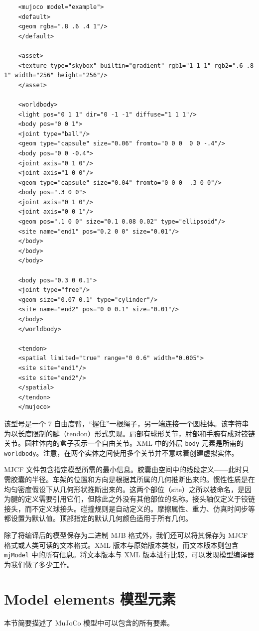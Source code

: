 \begin{lstlisting}
	<mujoco model="example">
	<default>
	<geom rgba=".8 .6 .4 1"/>
	</default>
	
	<asset>
	<texture type="skybox" builtin="gradient" rgb1="1 1 1" rgb2=".6 .8 1" width="256" height="256"/>
	</asset>
	
	<worldbody>
	<light pos="0 1 1" dir="0 -1 -1" diffuse="1 1 1"/>
	<body pos="0 0 1">
	<joint type="ball"/>
	<geom type="capsule" size="0.06" fromto="0 0 0  0 0 -.4"/>
	<body pos="0 0 -0.4">
	<joint axis="0 1 0"/>
	<joint axis="1 0 0"/>
	<geom type="capsule" size="0.04" fromto="0 0 0  .3 0 0"/>
	<body pos=".3 0 0">
	<joint axis="0 1 0"/>
	<joint axis="0 0 1"/>
	<geom pos=".1 0 0" size="0.1 0.08 0.02" type="ellipsoid"/>
	<site name="end1" pos="0.2 0 0" size="0.01"/>
	</body>
	</body>
	</body>
	
	<body pos="0.3 0 0.1">
	<joint type="free"/>
	<geom size="0.07 0.1" type="cylinder"/>
	<site name="end2" pos="0 0 0.1" size="0.01"/>
	</body>
	</worldbody>
	
	<tendon>
	<spatial limited="true" range="0 0.6" width="0.005">
	<site site="end1"/>
	<site site="end2"/>
	</spatial>
	</tendon>
	</mujoco>
\end{lstlisting}

该型号是一个 7 自由度臂，“握住”一根绳子，另一端连接一个圆柱体。该字符串为以长度限制的腱（tendon）形式实现。肩部有球形关节，肘部和手腕有成对铰链关节。圆柱体内的盒子表示一个自由关节。XML 中的外层 \texttt{body} 元素是所需的 \texttt{worldbody}。注意，在两个实体之间使用多个关节并不意味着创建虚拟实体。

MJCF 文件包含指定模型所需的最小信息。胶囊由空间中的线段定义——此时只需胶囊的半径。车架的位置和方向是根据其所属的几何推断出来的。惯性性质是在均匀密度假设下从几何形状推断出来的。这两个部位（site）之所以被命名，是因为腱的定义需要引用它们，但除此之外没有其他部位的名称。接头轴仅定义于铰链接头，而不定义球接头。碰撞规则是自动定义的。摩擦属性、重力、仿真时间步等都设置为默认值。顶部指定的默认几何颜色适用于所有几何。

除了将编译后的模型保存为二进制 MJB 格式外，我们还可以将其保存为 MJCF 格式或人类可读的文本格式。XML 版本与原始版本类似，而文本版本则包含 \texttt{mjModel} 中的所有信息。将文本版本与 XML 版本进行比较，可以发现模型编译器为我们做了多少工作。

\section{Model elements 模型元素}
本节简要描述了 MuJoCo 模型中可以包含的所有要素。

